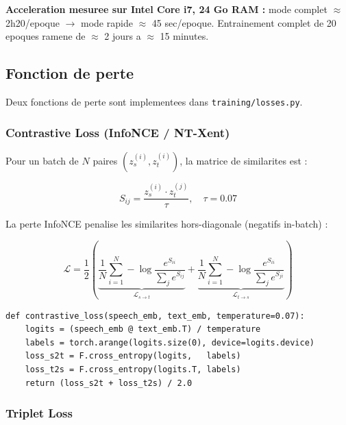 \documentclass[12pt, a4paper]{article}
\begin{document}
\begin{resultbox}
\textbf{Acceleration mesuree sur Intel Core i7, 24 Go RAM :}
mode complet $\approx$ 2h20/epoque $\rightarrow$ mode rapide $\approx$ 45 sec/epoque.
Entrainement complet de 20 epoques ramene de $\approx$ 2 jours a $\approx$ 15 minutes.
\end{resultbox}

\subsection{Fonction de perte}

Deux fonctions de perte sont implementees dans \texttt{training/losses.py}.

\subsubsection{Contrastive Loss (InfoNCE / NT-Xent)}

Pour un batch de $N$ paires $(z_s^{(i)}, z_t^{(i)})$, la matrice de similarites est :

\begin{equation}
  S_{ij} = \frac{z_s^{(i)} \cdot z_t^{(j)}}{\tau}, \quad \tau = 0.07
\end{equation}

La perte InfoNCE penalise les similarites hors-diagonale (negatifs in-batch) :

\begin{equation}
  \mathcal{L} =
  \frac{1}{2}
  \left(
    \underbrace{\frac{1}{N}\sum_{i=1}^{N} -\log \frac{e^{S_{ii}}}{\sum_j e^{S_{ij}}}}_{\mathcal{L}_{s \to t}}
    +
    \underbrace{\frac{1}{N}\sum_{i=1}^{N} -\log \frac{e^{S_{ii}}}{\sum_j e^{S_{ji}}}}_{\mathcal{L}_{t \to s}}
  \right)
\end{equation}

\begin{lstlisting}[caption={Contrastive loss (InfoNCE) -- training/losses.py}]
def contrastive_loss(speech_emb, text_emb, temperature=0.07):
    logits = (speech_emb @ text_emb.T) / temperature
    labels = torch.arange(logits.size(0), device=logits.device)
    loss_s2t = F.cross_entropy(logits,   labels)
    loss_t2s = F.cross_entropy(logits.T, labels)
    return (loss_s2t + loss_t2s) / 2.0
\end{lstlisting}

\subsubsection{Triplet Loss}
\end{document}
